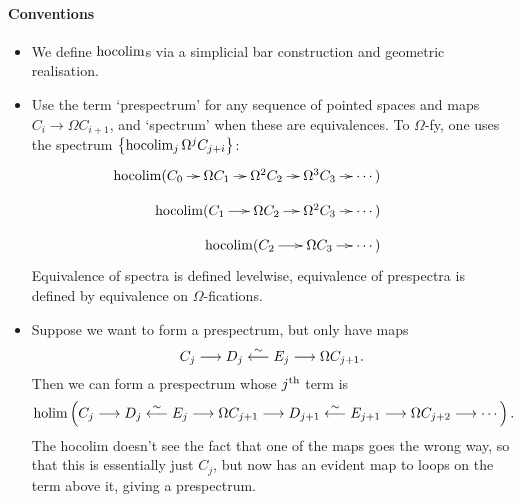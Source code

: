 \documentclass[11pt]{article}
\begin{document}
\begin{Calculus I}
\paragraph*{Conventions}
\begin{itemize}\squishlist
\setlength{\parindent}{.25in}
\item We define $\operatorname*{hocolim}$s via a simplicial bar construction and geometric realisation.
\item Use the term `prespectrum' for any sequence of  pointed spaces and maps $C_i\to\Omega C_{i+1}$, and `spectrum' when these are equivalences. To $\Omega$-fy, one uses the spectrum $\left\{ \operatorname*{hocolim}_j\Omega^jC_{j+i}\right\}$:
\[\xymatrix@=3mm{
\makebox[0cm][r]{$\hocolim($}C_0
\ar[r]
&
\Omega C_1
\ar[r]
&%
\Omega^2 C_2
\ar[r]
&%
\Omega^3C_3
\ar[r]
&%
\makebox[0cm][l]{$\cdots )$}&%
\\
&
\makebox[0cm][r]{$\hocolim($}C_1
\ar[r]
&
\Omega C_2
\ar[r]
&%
\Omega^2 C_3
\ar[r]
&%
\makebox[0cm][l]{$\cdots )$}&%
\\
&&
\makebox[0cm][r]{$\hocolim($}C_2
\ar[r]
&
\Omega C_3
\ar[r]
&%
\makebox[0cm][l]{$\cdots )$}&%
}\]
Equivalence of spectra is defined levelwise, equivalence of prespectra is defined by equivalence on $\Omega$-fications.
\item Suppose we want to form a prespectrum, but only have maps
\[C_j\longrightarrow D_j\overset{\sim}{\longleftarrow}E_j\longrightarrow\Omega C_{j+1}.\]
Then we can form a prespectrum whose $j^\textup{th}$ term is
\[\operatorname*{holim}\left(C_j\longrightarrow D_j\overset{\sim}{\longleftarrow}E_j\longrightarrow\Omega C_{j+1}\longrightarrow D_{j+1}\overset{\sim}{\longleftarrow}E_{j+1}\longrightarrow\Omega C_{j+2}\longrightarrow\cdots \right).\]
The hocolim doesn't see the fact that one of the maps goes the wrong way, so that this is essentially just $C_j$, but now has an evident map to loops on the term above it, giving a prespectrum.
\end{itemize}

\end{Calculus I}
\end{document}
